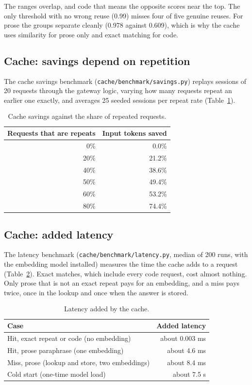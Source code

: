 \documentclass[12pt, a4paper, oneside]{report}
\newcommand{\code}[1]{\texttt{#1}}
\begin{document}
The ranges overlap, and code that means the opposite scores near the top. The
only threshold with no wrong reuse (0.99) misses four of five genuine reuses. For
prose the groups separate cleanly (0.978 against 0.609), which is why the cache
uses similarity for prose only and exact matching for code.

\subsection{Cache: savings depend on repetition}

The cache savings benchmark (\code{cache/benchmark/savings.py}) replays sessions
of 20 requests through the gateway logic, varying how many requests repeat an
earlier one exactly, and averages 25 seeded sessions per repeat rate
(Table~\ref{tab:repeat}).

\begin{table}[H]
\centering
\begin{tabular}{rr}
\toprule
Requests that are repeats & Input tokens saved \\
\midrule
0\%  & 0.0\% \\
20\% & 21.2\% \\
40\% & 38.6\% \\
50\% & 49.4\% \\
60\% & 53.2\% \\
80\% & 74.4\% \\
\bottomrule
\end{tabular}
\caption{Cache savings against the share of repeated requests.}
\label{tab:repeat}
\end{table}

\subsection{Cache: added latency}

The latency benchmark (\code{cache/benchmark/latency.py}, median of 200 runs, with
the embedding model installed) measures the time the cache adds to a request
(Table~\ref{tab:latency}). Exact matches, which include every code request, cost
almost nothing. Only prose that is not an exact repeat pays for an embedding, and
a miss pays twice, once in the lookup and once when the answer is stored.

\begin{table}[H]
\centering
\begin{tabular}{lr}
\toprule
Case & Added latency \\
\midrule
Hit, exact repeat or code (no embedding)    & about 0.003 ms \\
Hit, prose paraphrase (one embedding)       & about 4.6 ms \\
Miss, prose (lookup and store, two embeddings) & about 8.4 ms \\
Cold start (one-time model load)            & about 7.5 s \\
\bottomrule
\end{tabular}
\caption{Latency added by the cache.}
\label{tab:latency}
\end{table}
\end{document}
